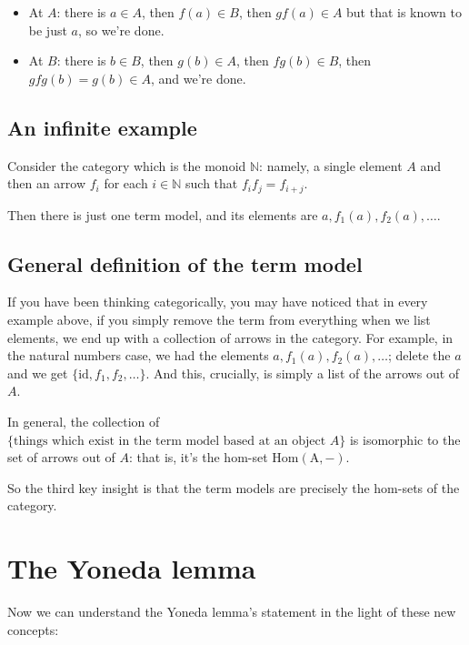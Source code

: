 \documentclass[11pt]{amsart}
\newcommand{\homfrom}[1]{\mathrm{Hom\left(#1, -\right)}}
\begin{document}
    \begin{itemize}
        \item At $A$: there is $a \in A$, then $f(a) \in B$, then $gf(a) \in A$ but that is known to be just $a$, so we're done.
        \item At $B$: there is $b \in B$, then $g(b) \in A$, then $fg(b) \in B$, then $gfg(b) = g(b) \in A$, and we're done.
    \end{itemize}

    \subsection{An infinite example}

    Consider the category which is the monoid $\mathbb{N}$: namely, a single element $A$ and then an arrow $f_i$ for each $i \in \mathbb{N}$ such that $f_i f_j = f_{i+j}$.

    Then there is just one term model, and its elements are $a, f_1(a), f_2(a), \dots$.

    \subsection{General definition of the term model}

    If you have been thinking categorically, you may have noticed that in every example above, if you simply remove the term from everything when we list elements, we end up with a collection of arrows in the category.
    For example, in the natural numbers case, we had the elements $a, f_1(a), f_2(a), \dots$; delete the $a$ and we get $\{\mathrm{id}, f_1, f_2, \dots\}$.
    And this, crucially, is simply a list of the arrows out of $A$.

    In general, the collection of $\{\text{things which exist in the term model based at an object $A$}\}$ is isomorphic to the set of arrows out of $A$:
    that is, it's the hom-set $\homfrom{A}$.

    So the third key insight is that the term models are precisely the hom-sets of the category.

    \section{The Yoneda lemma}

    Now we can understand the Yoneda lemma's statement in the light of these new concepts:

    \
\end{document}
